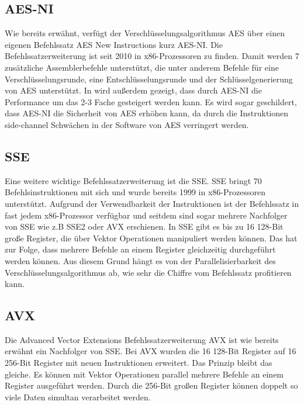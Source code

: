 \subsection{AES-NI}
Wie bereits erwähnt, verfügt der Verschlüsselungsalgorithmus \gls{AES} über einen eigenen Befehlssatz AES New Instructions kurz \gls{AES-NI}. Die Befehlssatzerweiterung ist seit 2010 in x86-Prozessoren zu finden. Damit werden 7 zusätzliche Assemblerbefehle unterstützt, die unter anderem Befehle für eine Verschlüsselungsrunde, eine Entschlüsselungsrunde und der Schlüsselgenerierung von AES unterstützt. In \cite{gueron2010intel} wird außerdem gezeigt, dass durch AES-NI die Performance um das 2-3 Fache gesteigert werden kann. Es wird sogar geschildert, dass AES-NI die Sicherheit von AES erhöhen kann, da durch die Instruktionen side-channel Schwächen in der Software von AES verringert werden.
\subsection{SSE}
Eine weitere wichtige Befehlssatzerweiterung ist die \gls{SSE}. SSE bringt 70 Befehlsinstruktionen mit sich und wurde bereits 1999 in x86-Prozessoren unterstützt. Aufgrund der Verwendbarkeit der Instruktionen ist der Befehlssatz in fast jedem x86-Prozessor verfügbar und seitdem sind sogar mehrere Nachfolger von SSE wie z.B SSE2 oder AVX erschienen. In SSE gibt es bis zu 16 128-Bit große Register, die über Vektor Operationen manipuliert werden können. Das hat zur Folge, dass mehrere Befehle an einem Register gleichzeitig durchgeführt werden können. Aus diesem Grund hängt es von der Parallelisierbarkeit des Verschlüsselungsalgorithmus ab, wie sehr die Chiffre vom Befehlssatz profitieren kann\cite{Ankele2016SoftwareBO}.
\subsection{AVX}
Die Advanced Vector Extensions Befehlssatzerweiterung AVX ist wie bereits erwähnt ein Nachfolger von \gls{SSE}. Bei AVX wurden die 16 128-Bit Register auf 16 256-Bit Register mit neuen Instruktionen erweitert. Das Prinzip bleibt das gleiche. Es können mit Vektor Operationen parallel mehrere Befehle an einem Register ausgeführt werden. Durch die 256-Bit großen Register können doppelt so viele Daten simultan verarbeitet werden\cite{mosnavcekoptimizing}.

